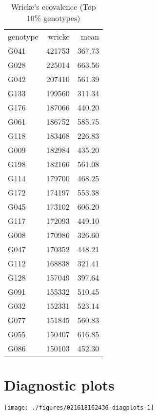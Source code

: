 \documentclass[a4paper,11pt]{article}\usepackage[]{graphicx}\usepackage[]{color}
\makeatletter
\def\maxwidth{ %
  \ifdim\Gin@nat@width>\linewidth
    \linewidth
  \else
    \Gin@nat@width
  \fi
}
\newenvironment{knitrout}{}{} %
\makeatother
\begin{document}
\begin{table}[ht]
\begin{flushleft}
\caption{Wricke's ecovalence (Top 10\% genotypes)} 
\label{wricke}
\begin{tabular}{lrr}
 genotype & wricke & mean \\ 
 G041 & 421753 & 367.73 \\ 
  G028 & 225014 & 663.56 \\ 
  G042 & 207410 & 561.39 \\ 
  G133 & 199560 & 311.34 \\ 
  G176 & 187066 & 440.20 \\ 
  G061 & 186752 & 585.75 \\ 
  G118 & 183468 & 226.83 \\ 
  G009 & 182984 & 435.20 \\ 
  G198 & 182166 & 561.08 \\ 
  G114 & 179700 & 468.25 \\ 
  G172 & 174197 & 553.38 \\ 
  G045 & 173102 & 606.20 \\ 
  G117 & 172093 & 449.10 \\ 
  G008 & 170986 & 326.60 \\ 
  G047 & 170352 & 448.21 \\ 
  G112 & 168838 & 321.41 \\ 
  G128 & 157049 & 397.64 \\ 
  G091 & 155332 & 510.45 \\ 
  G032 & 152331 & 523.14 \\ 
  G077 & 151845 & 560.83 \\ 
  G055 & 150407 & 616.85 \\ 
  G086 & 150103 & 452.30 \\ 
  \end{tabular}
\end{flushleft}
\end{table}


\clearpage
\section{Diagnostic plots}
\begin{knitrout}
\color{fgcolor}

\texttt{[image: ./figures/021618162436-diagplots-1]} \hfill{}



\end{knitrout}

\end{document}
